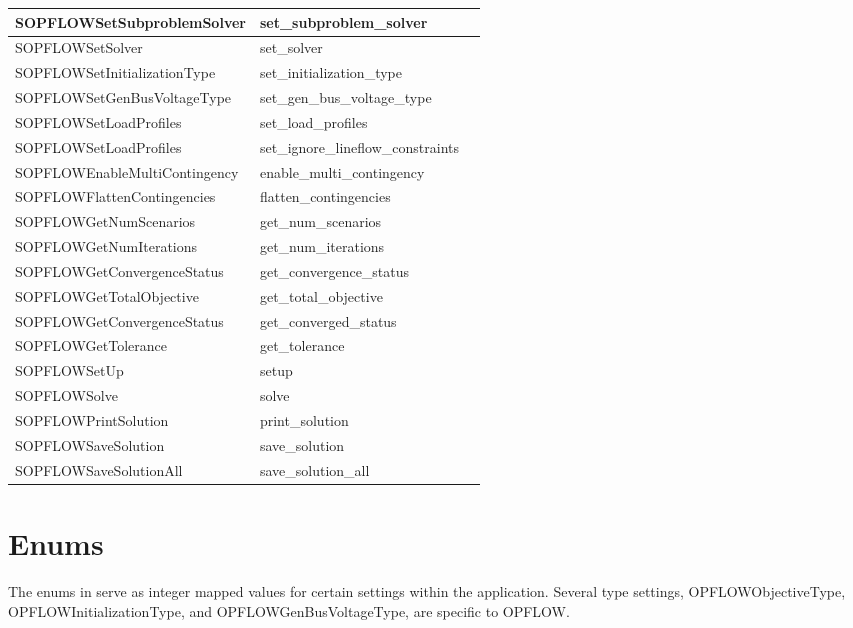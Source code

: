 {\begin{longtable}{|>{\ttfamily}p{}|>{\ttfamily}p{}|p{}|}
    SOPFLOWSetSubproblemSolver & set\_subproblem\_solver &  \\ \hline
    SOPFLOWSetSolver & set\_solver &  \\ \hline
    SOPFLOWSetInitializationType & set\_initialization\_type  &  \\ \hline
    SOPFLOWSetGenBusVoltageType & set\_gen\_bus\_voltage\_type &  \\ \hline
    SOPFLOWSetLoadProfiles & set\_load\_profiles &  \\ \hline
    SOPFLOWSetLoadProfiles & set\_ignore\_lineflow\_constraints &  \\ \hline
    SOPFLOWEnableMultiContingency & enable\_multi\_contingency &  \\ \hline
    SOPFLOWFlattenContingencies & flatten\_contingencies & \\ \hline
    SOPFLOWGetNumScenarios & get\_num\_scenarios &  \\ \hline
    SOPFLOWGetNumIterations & get\_num\_iterations &  \\ \hline
    SOPFLOWGetConvergenceStatus & get\_convergence\_status &  \\ \hline
    SOPFLOWGetTotalObjective & get\_total\_objective &  \\ \hline
    SOPFLOWGetConvergenceStatus & get\_converged\_status &  \\ \hline
    SOPFLOWGetTolerance & get\_tolerance &  \\ \hline
    SOPFLOWSetUp & setup &  \\ \hline
    SOPFLOWSolve & solve &  \\ \hline
    SOPFLOWPrintSolution & print\_solution & \\ \hline
    SOPFLOWSaveSolution & save\_solution & \\ \hline
    SOPFLOWSaveSolutionAll & save\_solution\_all &  \\ \hline

    \hline
\end{longtable}
}

\section{Enums} \label{sec:python-enum}

The enums in \exago serve as integer mapped values for certain settings within the application. Several type settings, OPFLOWObjectiveType, OPFLOWInitializationType, and OPFLOWGenBusVoltageType, are specific to OPFLOW. 

